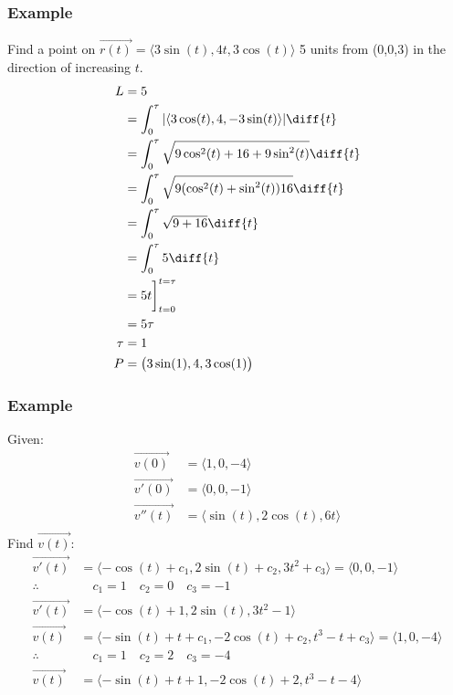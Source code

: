 \documentclass[letterpaper, 12pt]{math}
\begin{document}
\subsubsection*{Example}
Find a point on \( \overrightarrow{r(t)} = \langle3\sin(t),4t,3\cos(t)
\rangle \) 5 units from (0,0,3) in the direction of increasing \( t \).
\begin{align*}
  L &= 5 \\
  &= \int_{0}^{\tau}|\langle3\cos(t),4,-3\sin(t)\rangle|\diff{t} \\
  &= \int_{0}^{\tau}\sqrt{9\cos^2(t)+16+9\sin^2(t)}\diff{t} \\
  &= \int_{0}^{\tau}\sqrt{9(\cos^2(t)+\sin^2(t))16}\diff{t} \\
  &= \int_{0}^{\tau}\sqrt{9+16}\diff{t} \\
  &= \int_{0}^{\tau}5\diff{t} \\
  &= 5t\bigg]_{t=0}^{t=\tau} \\
  &= 5\tau \\
  \tau &= 1 \\
  P &= \big(3\sin(1),4,3\cos(1)\big)
\end{align*}

\subsubsection*{Example}
Given:
\begin{align*}
  \overrightarrow{v(0)} &= \langle1,0,-4\rangle \\
  \overrightarrow{v'(0)} &= \langle0,0,-1\rangle \\
  \overrightarrow{v''(t)} &= \langle\sin(t),2\cos(t),6t\rangle \\
\end{align*}
Find \( \overrightarrow{v(t)} \):
\begin{align*}
  \overrightarrow{v'(t)} &= \langle-\cos(t)+c_1,2\sin(t)+c_2,3t^2+c_3
    \rangle = \langle0,0,-1\rangle \\
  \therefore & \quad c_1 = 1 \quad c_2 = 0 \quad c_3 = -1 \\
  \overrightarrow{v'(t)} &= \langle-\cos(t)+1,2\sin(t),3t^2-1\rangle \\
  \overrightarrow{v(t)} &= \langle-\sin(t)+t+c_1,-2\cos(t)+c_2,t^3-t+c_3
    \rangle = \langle1,0,-4\rangle \\
  \therefore & \quad c_1 = 1 \quad c_2 = 2 \quad c_3 = -4 \\
  \overrightarrow{v(t)} &= \langle-\sin(t)+t+1,-2\cos(t)+2,t^3-t-4\rangle
\end{align*}
\end{document}
